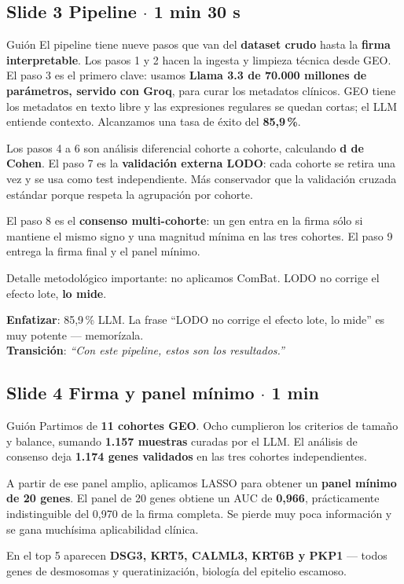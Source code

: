 \documentclass[11pt, a4paper]{article}
\newcommand{\slidebadge}[1]{{\colorbox{verdeTerm}{\color{white}\bfseries\;#1\;}}}
\begin{document}
\subsection*{\slidebadge{Slide 3} Pipeline $\cdot$ 1 min 30 s}

\begin{guioncaja}{Gui\'on}
El pipeline tiene nueve pasos que van del \textbf{dataset crudo} hasta la \textbf{firma interpretable}. Los pasos 1 y 2 hacen la ingesta y limpieza t\'ecnica desde GEO. El paso 3 es el primero clave: usamos \textbf{Llama 3.3 de 70.000 millones de par\'ametros, servido con Groq}, para curar los metadatos cl\'inicos. GEO tiene los metadatos en texto libre y las expresiones regulares se quedan cortas; el LLM entiende contexto. Alcanzamos una tasa de \'exito del \textbf{85,9\,\%}.

Los pasos 4 a 6 son an\'alisis diferencial cohorte a cohorte, calculando \textbf{d de Cohen}. El paso 7 es la \textbf{validaci\'on externa LODO}: cada cohorte se retira una vez y se usa como test independiente. M\'as conservador que la validaci\'on cruzada est\'andar porque respeta la agrupaci\'on por cohorte.

El paso 8 es el \textbf{consenso multi-cohorte}: un gen entra en la firma s\'olo si mantiene el mismo signo y una magnitud m\'inima en las tres cohortes. El paso 9 entrega la firma final y el panel m\'inimo.

Detalle metodol\'ogico importante: no aplicamos ComBat. LODO no corrige el efecto lote, \textbf{lo mide}.
\end{guioncaja}

\textbf{Enfatizar}: 85,9\,\% LLM. La frase ``LODO no corrige el efecto lote, lo mide'' es muy potente --- memor\'izala.\\
\textbf{Transici\'on}: \emph{``Con este pipeline, estos son los resultados.''}

\subsection*{\slidebadge{Slide 4} Firma y panel m\'inimo $\cdot$ 1 min}

\begin{guioncaja}{Gui\'on}
Partimos de \textbf{11 cohortes GEO}. Ocho cumplieron los criterios de tama\~no y balance, sumando \textbf{1.157 muestras} curadas por el LLM. El an\'alisis de consenso deja \textbf{1.174 genes validados} en las tres cohortes independientes.

A partir de ese panel amplio, aplicamos LASSO para obtener un \textbf{panel m\'inimo de 20 genes}. El panel de 20 genes obtiene un AUC de \textbf{0,966}, pr\'acticamente indistinguible del 0,970 de la firma completa. Se pierde muy poca informaci\'on y se gana much\'isima aplicabilidad cl\'inica.

En el top 5 aparecen \textbf{DSG3, KRT5, CALML3, KRT6B y PKP1} --- todos genes de desmosomas y queratinizaci\'on, biolog\'ia del epitelio escamoso.
\end{guioncaja}
\end{document}
